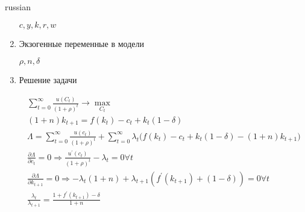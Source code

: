 \documentclass{article}
\begin{document}
\begin{otherlanguage*}{russian}
\begin{enumerate}
$ c, y, k, r, w $ 

\item Экзогенные переменные в модели

$\rho, n, \delta $ 

\item Решение задачи

\begin{align}
\sum_{t = 0}^{\infty} \frac{u(C_t)}{(1 + \rho)^t} \rightarrow \max_{C_t} \\
(1 + n) k_{t+1} = f(k_t) - c_t + k_t (1 - \delta) \\
\Lambda = \sum_{t = 0}^\infty \frac{u(c_t)}{(1 + \rho)^t} + \sum_{t = 0}^{\infty} \lambda_t \Big( f(k_t) - c_t + k_t (1 - \delta) - (1+ n) k_{t + 1} \Big) \\
\frac{\partial \Lambda}{\partial c_t} = 0 \Rightarrow \frac{u^{'}(c_t)}{(1 + \rho)^t} - \lambda_t = 0 \forall t \\ 
\frac{\partial \Lambda}{\partial k_{t+ 1}} = 0 \Rightarrow - \lambda_t (1 + n) + \lambda_{t + 1} (f^{'}(k_{t+1}) + (1 - \delta)) = 0 \forall t \\
\frac{\lambda_t}{\lambda_{t+1}} = \frac{1 + f^{'}(k_{t+1}) - \delta}{1 + n}
\end{align}
\end{enumerate}
\end{otherlanguage*}
\end{document}
